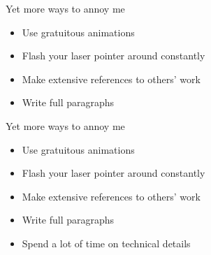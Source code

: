 \documentclass[12pt]{article}
\newcommand{\headsize}{\fontsize{35}{35} \selectfont}
\newcommand{\smallsize}{\fontsize{25}{30} \selectfont}
\begin{document}
\newpage

\headsize \color{myyellow}
\hfill \begin{minipage}{6.25in}
\centering
Yet more ways to annoy me
\end{minipage}

\vspace{30mm} \color{mywhite} \smallsize

\hfill \begin{minipage}{9.5in}

\begin{itemize}
\itemsep18pt

\item Use gratuitous animations

\item Flash your laser pointer around constantly 

\item Make extensive references to others' work

\item Write full paragraphs

\end{itemize}

\end{minipage}


\newpage

\headsize \color{myyellow}
\hfill \begin{minipage}{6.25in}
\centering
Yet more ways to annoy me
\end{minipage}

\vspace{30mm} \color{mywhite} \smallsize

\hfill \begin{minipage}{9.5in}

\begin{itemize}
\itemsep18pt

\item Use gratuitous animations

\item Flash your laser pointer around constantly 

\item Make extensive references to others' work

\item Write full paragraphs
\item Spend a lot of time on technical details

\end{itemize}

\end{minipage}
\end{document}
